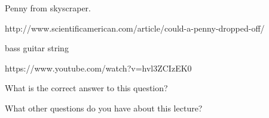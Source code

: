 \documentclass{ximera}
\begin{document}
Penny from skyscraper. 

http://www.scientificamerican.com/article/could-a-penny-dropped-off/

bass guitar string

https://www.youtube.com/watch?v=hvl3ZCIzEK0

\begin{question}
  What is the correct answer to this question?

  \begin{solution}
    \begin{multiple-choice}
    \end{multiple-choice}  
  \end{solution}
\end{question}

What other questions do you have about this lecture?
\begin{free-response}
\end{free-response}
\end{document}
